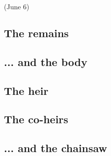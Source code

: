  (June 6)


\subsection{The remains}


\subsection{... and the body}


\subsection{The heir}


\subsection{The co-heirs}






\subsection{... and the chainsaw}








%
